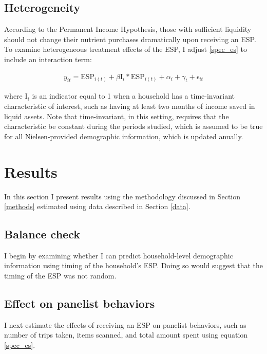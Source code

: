 \documentclass[12pt]{article}
\begin{document}
\subsection{Heterogeneity}

According to the Permanent Income Hypothesis, those with sufficient liquidity should not change their nutrient purchases dramatically upon receiving an ESP. To examine heterogeneous treatment effects of the ESP, I adjust \ref{spec_es} to include an interaction term:

\begin{align}
	y_{it} = \text{ESP}_{i(t)} + \beta \text{I}_{i} * \text{ESP}_{i(t)} + \alpha_i + \gamma_t + \epsilon_{it} \label{spec_het}
\end{align}

where $\text{I}_{i}$ is an indicator equal to 1 when a household has a time-invariant characteristic of interest, such as having at least two months of income saved in liquid assets. Note that time-invariant, in this setting, requires that the characteristic be constant during the periods studied, which is assumed to be true for all Nielsen-provided demographic information, which is updated anually.


\section{Results} \label{results}

In this section I present results using the methodology discussed in Section \ref{methods} estimated using data described in Section \ref{data}.

\subsection{Balance check}

I begin by examining whether I can predict household-level demographic information using timing of the household's ESP. Doing so would suggest that the timing of the ESP was not random.


\subsection{Effect on panelist behaviors}

I next estimate the effects of receiving an ESP on panelist behaviors, such as number of trips taken, items scanned, and total amount spent using equation \ref{spec_es}.
\end{document}
